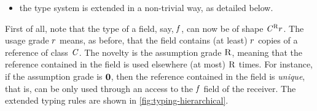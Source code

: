 \begin{itemize}
\begin{figure}
\begin{math}
\begin{array}{l}
\NamedRule{new}{
\begin{array}{l}
\RedVal{\ve_1}{\env}{\rgr\rmul\rgr_1}{\val_1}{\env_1}\\
\ldots\\
\RedVal{\ve_n}{\env_{n-1}}{\rgr\rmul\rgr_n}{\val_n}{\env'}\\
\end{array}}
{ \reduce{\Conf{\New{\C}{\ve_1,\ldots,\ve_n}}{\env}{\mem}}{\rgr}{\Conf{\Obj{\C}{\GradedValInd{\val}{1}{\rgr},\ldots,\GradedValInd{\val}{n}{\rgr}}}{\env'}{\mem,\MemElem{\loc}{\obj}}}}
{
  \fnames{\C}=\f_1\ldots\f_n\\
\loc\not\in\dom{\mem}
}
\end{array}
\end{math}
\caption{Reduction rules for hierarchical memory}
\label{fig:semantics-hierarchical} 
\end{figure}
\item the type system is extended in a non-trivial way, as detailed below.
\end{itemize}


First of all, note that the type of a field, say, $\mathit{f}$, can now be of shape $\mathit{C}^{\textsc{R}}{r}$. The usage grade $r$ means, as before, that the field contains (at least) $r$ copies of a reference of class $\mathit{C}$. 
The novelty is the assumption grade $\textsc{R}$, meaning that the reference contained in the field is used elsewhere (at most) $\textsc{R}$ times. For instance, if the assumption grade is $\mathbf{0}$, then the reference contained in the field is \emph{unique}, that is, can be only used through an access to the $\mathit{f}$ field of the receiver. 
The extended typing rules are shown in \cref{fig:typing-hierarchical}.

